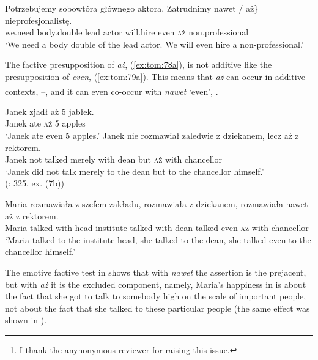 \documentclass[output=paper,colorlinks,citecolor=brown]{langscibook}
\begin{document}
\ea\label{ex:tom:80}
\gll Potrzebujemy sobowtóra głównego  aktora. Zatrudnimy \minsp{\{} nawet / \minsp{\#} aż\}   nieprofesjonalistę.\\
we.need body.double lead actor will.hire {} even {} {} \textsc{aż} non.professional\\
\glt `We need a body double of the lead actor. We will even hire a non-professional.’
\z

\noindent The factive presupposition of \textit{aż}, (\ref{ex:tom:78a}), is not additive like the presupposition of \textit{even}, (\ref{ex:tom:79a}). This means that \textit{aż} can occur in additive contexts, --, and it can even co-occur with \textit{nawet} `even', .\footnote{I thank the anynonymous reviewer for raising this issue.} 

\ea\label{ex:tom:apples} 
\ea\label{ex:tom:applesa} 
\gll Janek zjadł aż 5 jabłek.\\
Janek ate \textsc{aż} 5 apples\\
\glt `Janek ate even 5 apples.’
\ex\label{ex:tom:applesb} 
\gll Janek nie rozmawiał zaledwie z dziekanem, lecz aż z rektorem.\\
Janek not talked merely with dean but \textsc{aż} with chancellor\\
\glt `Janek did not talk merely to the dean but to the chancellor himself.’\\\hfill \hfill (\citealt{tomaszewicz12}: 325, ex. (7b))
\z 
\z 

\ea\label{ex:tom:head}  
\gll Maria rozmawiała z szefem zakładu, rozmawiała z dziekanem, rozmawiała nawet aż z rektorem.\\
Maria talked with head institute talked with dean talked even \textsc{aż} with chancellor\\
\glt `Maria talked to the institute head, she talked to the dean, she talked even to the chancellor himself.’
\z

\noindent The emotive factive test in  shows that with \textit{nawet} the assertion is the prejacent, but with \textit{aż} it is the excluded component, namely, Maria’s happiness in  is about the fact that she got to talk to somebody high on the scale of important people, not about the fact that she talked to these particular people (the same effect was shown in ). 
\end{document}
